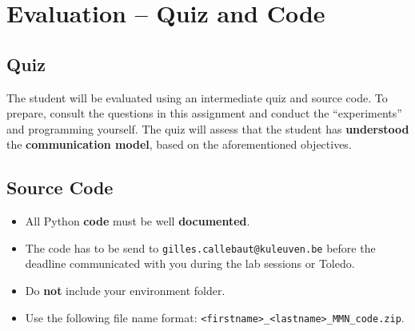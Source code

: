 \documentclass[12pt,a4paper]{article}
\begin{document}
\section{Evaluation -- Quiz and Code}

\subsection{Quiz}
The student will be evaluated using an intermediate quiz and source code. To prepare, consult the questions in this assignment and conduct the ``experiments'' and programming yourself. The quiz will assess that the student has \textbf{understood} the \textbf{communication model}, based on the aforementioned objectives. 

\subsection{Source Code}
\begin{itemize}
	\item All Python \textbf{code} must be well \textbf{documented}.
	\item The code has to be send to \texttt{gilles.callebaut@kuleuven.be} before the deadline communicated with you during the lab sessions or Toledo.
	\item Do \textbf{not} include your environment folder. 
	\item Use the following file name format: \texttt{<firstname>\_<lastname>\_MMN\_code.zip}.
\end{itemize}



% 
% 
\end{document}
